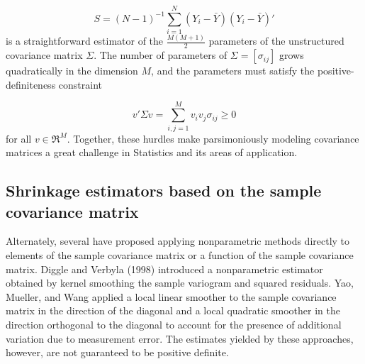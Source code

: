 \documentclass[12pt]{article}
\newcommand*\needsparaphrased{\color{red}}
\theoremstyle{definition}
\begin{document}
\begin{equation} \label{eq:sample-covariance-matrix}
S = \left(N-1\right)^{-1} \sum_{i = 1}^N \left(Y_i - \bar{Y}\right)\left(Y_i - \bar{Y}\right)'
\end{equation}
\noindent
is a straightforward estimator of the $\frac{M\left(M+1\right)}{2}$ parameters of the unstructured covariance matrix $\Sigma$. The number of parameters of $\Sigma = \left[ \sigma_{ij} \right]$ grows quadratically in the dimension $M$, and the parameters must satisfy the positive-definiteness constraint

\begin{equation} \label{eq:positive-definite-constraint} 
v'\Sigma v = \sum_{i,j = 1}^M v_i v_j \sigma_{ij} \ge 0 
\end{equation}
\noindent
for all $v \in \Re^M$. Together, these hurdles make parsimoniously modeling covariance matrices a great challenge in Statistics and its areas of application.

\bigskip






\subsection{Shrinkage estimators based on the sample covariance matrix}


Alternately, several have proposed applying nonparametric methods directly to elements of the sample covariance matrix or a function of the sample covariance matrix. Diggle and Verbyla (1998) introduced a nonparametric estimator obtained by kernel smoothing the sample variogram and squared residuals.  Yao, Mueller, and Wang applied a local linear smoother to the sample covariance matrix in the direction of the diagonal and a local quadratic smoother in the direction orthogonal to the diagonal to account for the presence of additional variation due to measurement error.  {\needsparaphrased{[REVIEW 2009 WU AND POURAHMADI METHOD: banding the sample covariance matrix. Under the assumption of short range dependency, they show that their estimator converges to the true covariance matrix for a broad class of nonlinear processes.]} }The estimates yielded by these approaches, however, are not guaranteed to be positive definite. 
\end{document}
